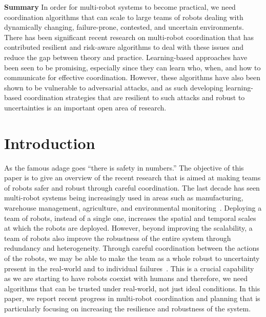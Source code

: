 \noindent\textbf{Summary} In order for multi-robot systems to become practical, we need coordination algorithms that can scale to large teams of robots dealing with dynamically changing, failure-prone, contested, and uncertain environments. There has been significant recent research on multi-robot coordination that has contributed resilient and risk-aware algorithms to deal with these issues and reduce the gap between theory and practice. Learning-based approaches have been seen to be promising, especially since they can learn who, when, and how to communicate for effective coordination. However, these algorithms have also been shown to be vulnerable to adversarial attacks, and as such developing learning-based coordination strategies that are resilient to such attacks and robust to uncertainties is an important open area of research.
 

\section{Introduction}
\label{sec:intro}
As the famous adage goes ``there is safety in numbers.'' The objective of this paper is to give an overview of the recent research that is aimed at making teams of robots safer and robust through careful coordination. The last decade has seen multi-robot systems being increasingly used in areas such as manufacturing, warehouse management, agriculture, and environmental monitoring~\cite{roadmap251:online,robothelp}. Deploying a team of robots, instead of a single one, increases the spatial and temporal scales at which the robots are deployed. However, beyond improving the scalability, a team of robots also improve the robustness of the entire system through redundancy and heterogeneity. Through careful coordination between the actions of the robots, we may be able to make the team as a whole robust to uncertainty present in the real-world and to individual failures~\cite{tzoumas2018resilient,zhou2018resilient}. This is a crucial capability as we are starting to have robots coexist with humans and therefore, we need algorithms that can be trusted under real-world, not just ideal conditions. In this paper, we report recent progress in multi-robot coordination and planning that is particularly focusing on increasing the resilience and robustness of the system.

